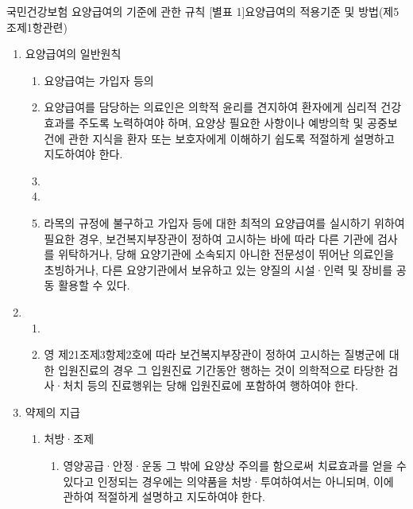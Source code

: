 국민건강보험 요양급여의 기준에 관한 규칙  [별표 1]요양급여의 적용기준 및 방법(제5조제1항관련)


\begin{enumerate}[1.]\tightlist
\item 요양급여의 일반원칙
	\begin{enumerate}[가.]\tightlist
	\item  요양급여는 가입자 등의 
	\item  요양급여를 담당하는 의료인은 의학적 윤리를 견지하여 환자에게 심리적 건강효과를 주도록 노력하여야 하며, 요양상 필요한 사항이나 예방의학 및 공중보건에 관한 지식을 환자 또는 보호자에게 이해하기 쉽도록 적절하게 설명하고 지도하여야 한다.
	\item  {}
	\item  {}
	\item  라목의 규정에 불구하고 가입자 등에 대한 최적의 요양급여를 실시하기 위하여 필요한 경우, 보건복지부장관이 정하여 고시하는 바에 따라 다른 기관에 검사를 위탁하거나, 당해 요양기관에 소속되지 아니한 전문성이 뛰어난 의료인을 초빙하거나, 다른 요양기관에서 보유하고 있는 양질의 시설·인력 및 장비를 공동 활용할 수 있다.
	\end{enumerate}
\item {}
	\begin{enumerate}[가.]\tightlist
	\item  {}
	\item  영 제21조제3항제2호에 따라 보건복지부장관이 정하여 고시하는 질병군에 대한 입원진료의 경우 그 입원진료 기간동안 행하는 것이 의학적으로 타당한 검사·처치 등의 진료행위는 당해 입원진료에 포함하여 행하여야 한다.
	\end{enumerate}
\item 약제의 지급 
	\begin{enumerate}[가.]\tightlist
	\item  처방·조제
		\begin{enumerate}[(1)]\tightlist
		\item 영양공급·안정·운동 그 밖에 요양상 주의를 함으로써 치료효과를 얻을 수 있다고 인정되는 경우에는 의약품을 처방·투여하여서는 아니되며, 이에 관하여 적절하게 설명하고 지도하여야 한다.

\end{enumerate}
\end{enumerate}
\end{enumerate}
